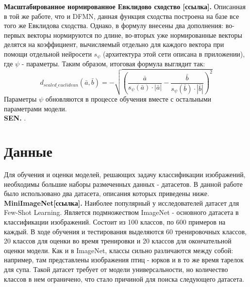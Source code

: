 \documentclass[a4paper, 12pt]{report}
\begin{document}
\textbf {Масштабированное нормированное Евклидово сходство [ссылка].}  Описанная в той же работе, что и DFMN, данная функция сходства построена на базе все того же Евклидова сходства. Однако, в формулу внесены два дополнения: во-первых векторы нормируются по длине, во-вторых уже нормированные векторы делятся на коэффициент, вычисляемый отдельно для каждого вектора при помощи отдельной нейросети $s_{\psi}$ (архитектура этой сети описана в приложении), где $\psi$ - параметры. Таким образом, итоговая формула выглядит так: $$d_{scaled\_euclidean}(\bar{a}, \bar{b}) =  -\sqrt{{ \left(\frac{\bar{a}}{s_{\psi}(\bar{a}) \cdot |\bar{a}|} - \frac{\bar{b}}{s_{\psi}(\bar{b}) \cdot |\bar{b}|}\right)}^2}$$  Параметры $\psi$ обновляются в процессе обучения вместе с остальными параметрами модели.\\

\textbf {SEN.} . \\

\section {Данные}

Для обучения и оценки моделей, решающих задачу классификации изображений, необходимы большие наборы размеченных данных - датасетов. В данной работе было использовано два датасета, описания которых приведены ниже.\\

\textbf {MiniImageNet[ссылка].} Наиболее популярный у исследователей датасет для Few-Shot Learning. Является подмножеством ImageNet - основного датасета в классификации изображений. Состоит из 100 классов, по 600 примеров на каждый. В ходе обучения и тестирования выделяются 60 тренировочных классов, 20 классов для оценки во время тренировки и 20 классов для окончательной оценки модели. Как и в ImageNet, классы сильно различаются между собой: например, там представлены изображения птиц - юрков и в то же время тарелок для супа. Такой датасет требует от модели универсальности, но количество классов в нем ограничено, что стало причиной для поиска следующего датасета. \\
\end{document}
